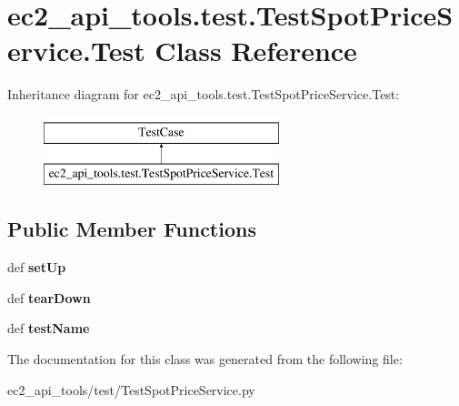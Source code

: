 \hypertarget{classec2__api__tools_1_1test_1_1TestSpotPriceService_1_1Test}{\section{ec2\-\_\-api\-\_\-tools.\-test.\-Test\-Spot\-Price\-Service.\-Test Class Reference}
\label{classec2__api__tools_1_1test_1_1TestSpotPriceService_1_1Test}
}
Inheritance diagram for ec2\-\_\-api\-\_\-tools.\-test.\-Test\-Spot\-Price\-Service.\-Test\-:\begin{figure}[H]
\begin{center}
\leavevmode
\includegraphics[height=2.000000cm]{classec2__api__tools_1_1test_1_1TestSpotPriceService_1_1Test}
\end{center}
\end{figure}
\subsection*{Public Member Functions}
\begin{DoxyCompactItemize}
\item 
\hypertarget{classec2__api__tools_1_1test_1_1TestSpotPriceService_1_1Test_abc04b0edd20c20964f2a02270b929f23}{def {\bfseries set\-Up}}\label{classec2__api__tools_1_1test_1_1TestSpotPriceService_1_1Test_abc04b0edd20c20964f2a02270b929f23}

\item 
\hypertarget{classec2__api__tools_1_1test_1_1TestSpotPriceService_1_1Test_aa5bdcdfd8f21ddff7268293fb4b4c029}{def {\bfseries tear\-Down}}\label{classec2__api__tools_1_1test_1_1TestSpotPriceService_1_1Test_aa5bdcdfd8f21ddff7268293fb4b4c029}

\item 
\hypertarget{classec2__api__tools_1_1test_1_1TestSpotPriceService_1_1Test_a981b63ccf9b34c697920cd8c21001552}{def {\bfseries test\-Name}}\label{classec2__api__tools_1_1test_1_1TestSpotPriceService_1_1Test_a981b63ccf9b34c697920cd8c21001552}

\end{DoxyCompactItemize}


The documentation for this class was generated from the following file\-:\begin{DoxyCompactItemize}
\item 
ec2\-\_\-api\-\_\-tools/test/Test\-Spot\-Price\-Service.\-py\end{DoxyCompactItemize}
